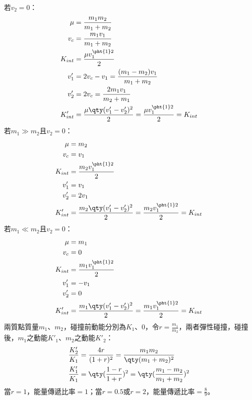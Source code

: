 \documentclass[a4paper,12pt]{article}
\begin{document}
若$v_2=0$：
\[\begin{aligned}
\mu&=\frac{m_1m_2}{m_1+m_2}\\
v_c &= \frac{m_1v_1}{m_1+m_2} \\
K_{int} &= \frac{\mu v_1^{\pht{1}2}}{2}\\
v_1' &= 2v_c - v_1 = \frac{(m_1-m_2)v_1}{m_1+m_2} \\
v_2' &= 2v_c = \frac{2m_1v_1}{m_2+m_1} \\
K_{int}' &= \frac{\mu \qty(v_1'-v_2')^2}{2} = \frac{\mu v_1^{\pht{1}2}}{2} = K_{int}
\end{aligned}\]
若$m_1\gg m_2$且$v_2=0$：
\[\begin{aligned}
\mu&=m_2\\
v_c &= v_1 \\
K_{int} &= \frac{m_2v_1^{\pht{1}2}}{2}\\
v_1' &= v_1 \\
v_2' &= 2v_1 \\
K_{int}' &= \frac{m_2 \qty(v_1'-v_2')^2}{2} = \frac{m_2v_1^{\pht{1}2}}{2} = K_{int}
\end{aligned}\]
若$m_1\ll m_2$且$v_2=0$：
\[\begin{aligned}
\mu&=m_1\\
v_c &= 0 \\
K_{int} &= \frac{m_1v_1^{\pht{1}2}}{2}\\
v_1' &= -v_1 \\
v_2' &= 0 \\
K_{int}' &= \frac{m_1\qty(v_1'-v_2')^2}{2} = \frac{m_1v_1^{\pht{1}2}}{2} = K_{int}
\end{aligned}\]
兩質點質量$m_1$、$m_2$，碰撞前動能分別為$K_1$、$0$，令$r=\frac{m_1}{m_2}$，兩者彈性碰撞，碰撞後，$m_1$之動能$K'_1$、$m_2$之動能$K'_2$：
\[\begin{aligned}
\frac{K'_2}{K_1} &= \frac{4r}{(1+r)^2} = \frac{m_1m_2}{\qty(m_1+m_2)^2} \\
\frac{K'_1}{K_1} &= \qty(\frac{1-r}{1+r})^2 = \qty(\frac{m_1-m_2}{m_1+m_2})^2
\end{aligned}\]
當$r=1$，能量傳遞比率$=1$；當$r=0.5$或$r=2$，能量傳遞比率$=\frac{8}{9}$。
\end{document}
